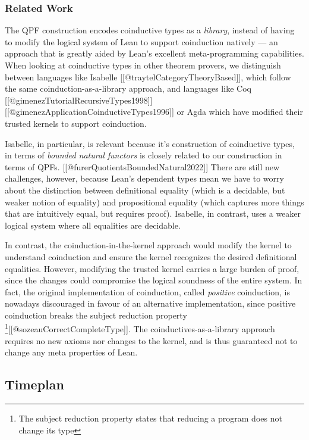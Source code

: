 \subsubsection{Related Work}\label{related-work-1}

The QPF construction encodes coinductive types as a \emph{library},
instead of having to modify the logical system of Lean to support
coinduction natively --- an approach that is greatly aided by Lean's
excellent meta-programming capabilities. When looking at coinductive
types in other theorem provers, we distinguish between languages like
Isabelle {[}{[}@traytelCategoryTheoryBased{]}{]}, which follow the same
coinduction-as-a-library approach, and languages like Coq
{[}{[}@gimenezTutorialRecursiveTypes1998{]}{]}{[}{[}@gimenezApplicationCoinductiveTypes1996{]}{]}
or Agda which have modified their trusted kernels to support
coinduction.

Isabelle, in particular, is relevant because it's construction of
coinductive types, in terms of \emph{bounded natural functors} is
closely related to our construction in terms of QPFs.
{[}{[}@furerQuotientsBoundedNatural2022{]}{]} There are still new
challenges, however, because Lean's dependent types mean we have to
worry about the distinction between definitional equality (which is a
decidable, but weaker notion of equality) and propositional equality
(which captures more things that are intuitively equal, but requires
proof). Isabelle, in contrast, uses a weaker logical system where all
equalities are decidable.

In contrast, the coinduction-in-the-kernel approach would modify the
kernel to understand coinduction and ensure the kernel recognizes the
desired definitional equalities. However, modifying the trusted kernel
carries a large burden of proof, since the changes could compromise the
logical soundness of the entire system. In fact, the original
implementation of coinduction, called \emph{positive} coinduction, is
nowadays discouraged in favour of an alternative implementation, since
positive coinduction breaks the subject reduction property
\footnote{ The subject reduction property states that reducing a program
  does not change its type}{[}{[}@sozeauCorrectCompleteType{]}{]}. The
coinductives-as-a-library approach requires no new axioms nor changes to
the kernel, and is thus guaranteed not to change any meta properties of
Lean.

\subsection{Timeplan}\label{timeplan}

